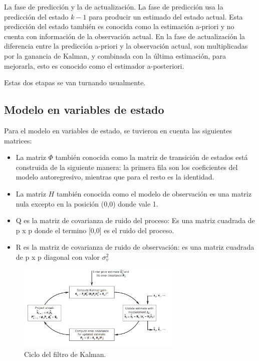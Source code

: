 La fase de predicción y la de actualización. La fase de predicción usa la predicción del estado $k-1$ para producir un estimado del estado actual. Esta predicción del estado también es conocida como la estimación a-priori y no cuenta con información de la observación actual.  En la fase de actualización la diferencia entre la predicción a-priori y la observación actual, son multiplicadas por la ganancia de Kalman, y combinada con la última estimación, para mejorarla, esto es conocido como el estimador a-posteriori.

Estas dos etapas se van turnando usualmente.\\


\subsection{Modelo en variables de estado}
Para el modelo en variables de estado, se tuvieron en cuenta las siguientes matrices:
\begin{itemize}
\item La matriz $\Phi$ también conocida como la matriz de transición de estados está construida de la siguiente manera: la primera fila son los coeficientes del modelo autoregresivo, mientras que para el resto es la identidad.
\item La matriz $H$ también conocida como el modelo de observación es una matriz nula excepto en la posición (0,0) donde vale 1.
\item Q es la matriz de covarianza de ruido del proceso: Es una matriz cuadrada de p x p  donde el termino [0,0] es el ruido del proceso.
\item R es la matriz de covarianza de ruido de observación: es una matriz cuadrada de p x p diagonal con valor $\sigma_v^2$
\end{itemize}
\begin{figure}[H]
\centering
	\includegraphics[width=0.7\textwidth, trim = {0 0 0 0},clip]{./Imagenes/kalman_loop.png}
	\caption{Ciclo del filtro de Kalman.}
	\label{fig:kalmanfilter_cicle}
\end{figure}


